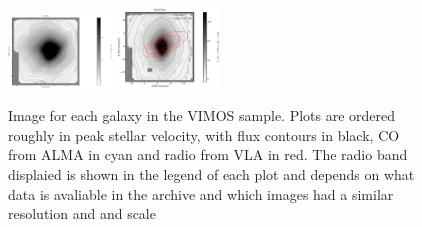 \begin{figure}
      \includegraphics[width=0.245\textwidth]{Vmaps/ngc1399_stellar_img.png}
      \includegraphics[width=0.245\textwidth]{Vmaps/eso443-g024_stellar_img.png}
      \caption[VIMOS images]{Image for each galaxy in the VIMOS sample. Plots are ordered roughly in peak stellar velocity, with flux contours in black, CO from ALMA in cyan and radio from VLA in red. The radio band displaied is shown in the legend of each plot and depends on what data is avaliable in the archive and which images had a similar resolution and and scale}
      \label{fig:Vstellar_img}
\end{figure}


